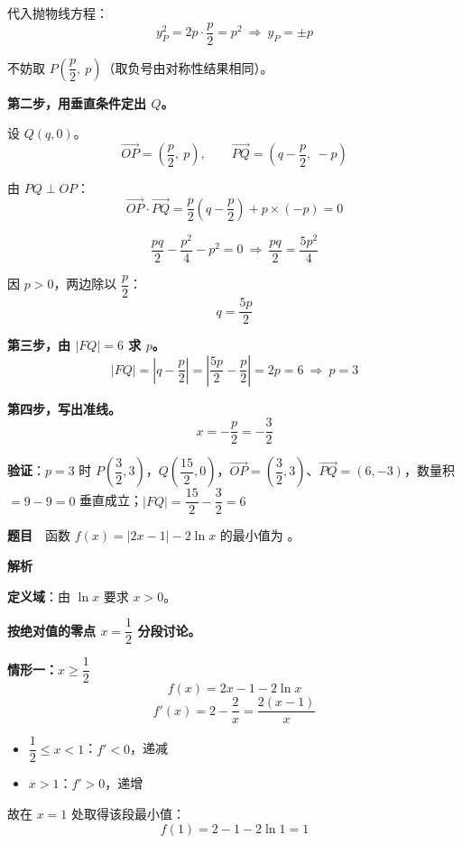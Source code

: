 代入抛物线方程：
\[y_P^{2}=2p\cdot\frac p2=p^{2}\ \Longrightarrow\ y_P=\pm p\]

不妨取 $P\left(\dfrac p2,\ p\right)$（取负号由对称性结果相同）。

\textbf{第二步，用垂直条件定出 $Q$。}

设 $Q(q,0)$。
\[\overrightarrow{OP}=\left(\frac p2,\ p\right),\qquad \overrightarrow{PQ}=\left(q-\frac p2,\ -p\right)\]

由 $PQ\perp OP$：
\[\overrightarrow{OP}\cdot\overrightarrow{PQ}=\frac p2\left(q-\frac p2\right)+p\times(-p)=0\]

\[\frac{pq}2-\frac{p^{2}}4-p^{2}=0\ \Longrightarrow\ \frac{pq}2=\frac{5p^{2}}4\]

因 $p>0$，两边除以 $\dfrac p2$：
\[q=\frac{5p}2\]

\textbf{第三步，由 $|FQ|=6$ 求 $p$。}
\[|FQ|=\left|q-\frac p2\right|=\left|\frac{5p}2-\frac p2\right|=2p=6\ \Longrightarrow\ p=3\]

\textbf{第四步，写出准线。}
\[x=-\frac p2=-\frac32\]


\begin{gktip}
\textbf{验证}：$p=3$ 时 $P\left(\dfrac32,3\right)$，$Q\left(\dfrac{15}2,0\right)$，$\overrightarrow{OP}=\left(\dfrac32,3\right)$、$\overrightarrow{PQ}=(6,-3)$，数量积 $=9-9=0$  垂直成立；$|FQ|=\dfrac{15}2-\dfrac32=6$ 
\end{gktip}

\par\medskip


\textbf{题目}　函数 $f(x)=|2x-1|-2\ln x$ 的最小值为 \gkblank{}。

\textbf{解析}

\textbf{定义域}：由 $\ln x$ 要求 $x>0$。

\textbf{按绝对值的零点 $x=\dfrac12$ 分段讨论。}

\par\medskip

\textbf{情形一：$x\ge\dfrac12$}
\[f(x)=2x-1-2\ln x\]
\[f'(x)=2-\frac2x=\frac{2(x-1)}x\]

\begin{itemize}
\item $\dfrac12\le x<1$：$f'<0$，递减
\item $x>1$：$f'>0$，递增
\end{itemize}

故在 $x=1$ 处取得该段最小值：
\[f(1)=2-1-2\ln1=1\]

